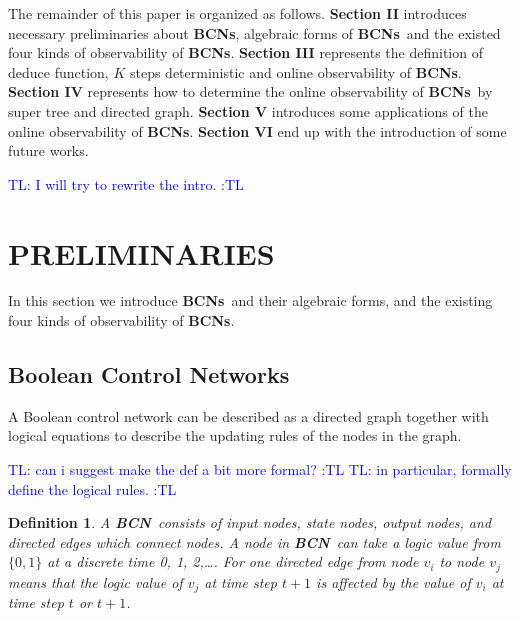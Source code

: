 \documentclass[letterpaper, 10 pt, conference]{ieeeconf}  %
\newtheorem{definition}{Definition}
\def \BCN {{\bf BCN}}
\def \BCNs {{\bf BCNs}}
\newcommand{\tl}[1]{\textcolor{blue} {TL: #1 :TL} }
\begin{document}
The remainder of this paper is organized as follows. {\bf Section II} introduces necessary preliminaries about {\bf BCNs}, algebraic forms of \BCNs\ and the existed four kinds of observability of {\bf BCNs}. {\bf Section III} represents the definition of deduce function, $K$ steps deterministic and online observability of {\bf BCNs}. {\bf Section IV} represents how to determine the online observability of \BCNs\ by super tree and directed graph. {\bf Section V} introduces some applications of the online observability of {\bf BCNs}. {\bf Section VI} end up  with the introduction of some future works.

\tl{I will try to rewrite the intro.}

\section{PRELIMINARIES}
In this section we introduce \BCNs\ and their algebraic forms, and  the existing four kinds of observability of {\bf BCNs}.



\subsection{Boolean Control Networks}

A Boolean control network can be described as a directed graph together with logical equations to describe the updating rules of the nodes in the   graph. 

\tl{can i suggest make the def a bit more formal?}
\tl{in particular, formally define the logical rules.}
\begin{definition}
A \BCN\ consists of input nodes, state nodes, output nodes, and directed edges which connect nodes. A node in \BCN\ can take a logic value from $\{0,1\}$ at a discrete time 0, 1, 2,\ldots. For one directed edge from node $v_i$ to node $v_j$ means that the logic value of $v_j$ at time step $t+1$ is affected by the value of $v_i$ at time step $t$ or $t+1$. 
\end{definition}


\end{document}
